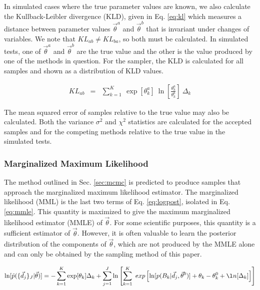 \documentclass[preprint]{aastex}
\begin{document}
In simulated cases where the true parameter values are known, we also calculate 
the Kullback-Leibler divergence (KLD), given in Eq. \ref{eq:kl} which measures 
a distance between parameter values $\vec{\theta}^{a}$ and $\vec{\theta}^{b}$ 
that is invariant under changes of variables.  We note that $KL_{ab}\neq 
KL_{ba}$, so both must be calculated.  In simulated tests, one of 
$\vec{\theta}^{a}$ and $\vec{\theta}^{b}$ are the true value and the other is 
the value produced by one of the methods in question.  For the sampler, the KLD 
is calculated for all samples and shown as a distribution of KLD values.

\begin{eqnarray}
\label{eq:kl}
KL_{ab} &=& \sum_{k=1}^{K}\ \exp[\theta_{k}^{a}]\ 
\ln\left[\frac{\theta_{k}^{a}}{\theta_{k}^{b}}\right]\ \Delta_{k}
\end{eqnarray}

The mean squared error of samples relative to the true value may also be 
calculated.  Both the variance $\sigma^{2}$ and $\chi^{2}$ statistics are 
calculated for the accepted samples and for the competing methods relative to 
the true value in the simulated tests.

\clearpage
\subsubsection{Marginalized Maximum Likelihood}
\label{sec:mmle}

The method outlined in Sec. \ref{sec:mcmc} is predicted to produce samples that 
approach the marginalized maximum likelihood estimator.  The marginalized 
likelihood (MML) is the last two terms of Eq. \ref{eq:logpost}, isolated in Eq. 
\ref{eq:mmle}.  This quantity is maximized to give the maximum marginalized 
likelihood estimator (MMLE) of $\vec{\theta}$.  For some scientific purposes, 
this quantity is a sufficient estimator of $\vec{\theta}$.  However, it is 
often valuable to learn the posterior distribution of the components of 
$\vec{\theta}$, which are not produced by the MMLE alone and can only be 
obtained by the sampling method of this paper.

\begin{eqnarray}
\label{eq:mmle}
\ln[\tilde{p}(\{\vec{d}_{j}\}_{J}|\vec{\theta})] = 
-\sum_{k=1}^{K}\exp[\theta_{k}]\Delta_{k}+\sum_{j=1}^{J}\ln\left[\sum_{k=1}^{K}\
exp\left[\ln[p(B_{k}|\vec{d}_{j},\vec{\theta}^{0})]+\theta_{k}-\theta_{k}^{0}+\l
n[\Delta_{k}]\right]\right]
\end{eqnarray}
\end{document}
